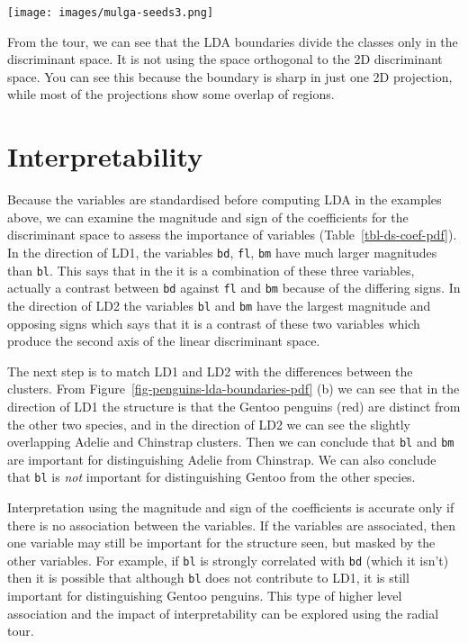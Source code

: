 \documentclass[
  letterpaper,
]{krantz}
\newcommand{\insightbox}[1]{%
\noindent\colorbox{insight!30}{%
\begin{minipage}{0.98\textwidth}%
    \centering%
    \begin{minipage}[c]{0.15\textwidth} %
      \texttt{[image: images/mulga-seeds3.png]} %
    \end{minipage}%
    \hfill %
    \begin{minipage}[c]{0.8\textwidth} %
      \bigskip%
      \textsf{#1}%
      \bigskip%
    \end{minipage}%
    \hspace*{3mm}%
  \end{minipage}%
}%
}
\begin{document}
\insightbox{From the tour, we can see that the LDA boundaries divide the classes only in the discriminant space. It is not using the space orthogonal to the 2D discriminant space. You can see this because the boundary is sharp in just one 2D projection, while most of the projections show some overlap of regions.}

\section{Interpretability}\label{interpretability}

Because the variables are standardised before computing LDA in the
examples above, we can examine the magnitude and sign of the
coefficients for the discriminant space to assess the importance of
variables (Table~\ref{tbl-ds-coef-pdf}). In the direction of LD1, the
variables \texttt{bd}, \texttt{fl}, \texttt{bm} have much larger
magnitudes than \texttt{bl}. This says that in the it is a combination
of these three variables, actually a contrast between \texttt{bd}
against \texttt{fl} and \texttt{bm} because of the differing signs. In
the direction of LD2 the variables \texttt{bl} and \texttt{bm} have the
largest magnitude and opposing signs which says that it is a contrast of
these two variables which produce the second axis of the linear
discriminant space.

The next step is to match LD1 and LD2 with the differences between the
clusters. From Figure~\ref{fig-penguins-lda-boundaries-pdf} (b) we can
see that in the direction of LD1 the structure is that the Gentoo
penguins (red) are distinct from the other two species, and in the
direction of LD2 we can see the slightly overlapping Adelie and
Chinstrap clusters. Then we can conclude that \texttt{bl} and
\texttt{bm} are important for distinguishing Adelie from Chinstrap. We
can also conclude that \texttt{bl} is \emph{not} important for
distinguishing Gentoo from the other species.

Interpretation using the magnitude and sign of the coefficients is
accurate only if there is no association between the variables. If the
variables are associated, then one variable may still be important for
the structure seen, but masked by the other variables. For example, if
\texttt{bl} is strongly correlated with \texttt{bd} (which it isn't)
then it is possible that although \texttt{bl} does not contribute to
LD1, it is still important for distinguishing Gentoo penguins. This type
of higher level association and the impact of interpretability can be
explored using the radial tour.
\end{document}
